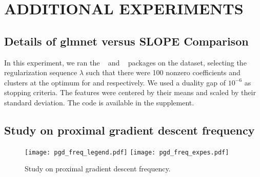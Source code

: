 \section{ADDITIONAL EXPERIMENTS}\label{sec:add_expes}

\subsection{Details of \textsf{glmnet} versus \textsf{SLOPE} Comparison}
\label{sec:slope-vs-glmnet}

In this experiment, we ran the ~\parencite{friedman2022} and ~\parencite{larsson2022d} packages on the  dataset, selecting the regularization sequence \(\lambda\) such that there were 100 nonzero coefficients and clusters at the optimum for  and  respectively.
We used a duality gap of \(10^{-6}\) as stopping criteria.
The features were centered by their means and scaled by their standard deviation.
The code is available in the supplement.

\subsection{Study on proximal gradient descent frequency}

\begin{figure*}[htb]
  \centering
  \texttt{[image: pgd\_freq\_legend.pdf]}
  \texttt{[image: pgd\_freq\_expes.pdf]}
  \caption{Study on proximal gradient descent frequency.}
  \label{fig:pgd_freq}
\end{figure*}
